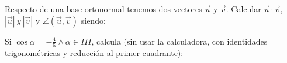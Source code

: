 \documentclass[addpoints,spanish, 12pt,a4paper]{exam}
\begin{document}
        \begin{questions}
        \question Respecto de una base ortonormal tenemos dos vectores $\overrightarrow{u}$ y $\overrightarrow{v}$.
Calcular $\overrightarrow{u}\cdot\overrightarrow{v}$, $|\overrightarrow{u}| \ y \ |\overrightarrow{v}|$ 
y $\angle(\overrightarrow{u},\overrightarrow{v})$ siendo:
        \begin{multicols}{1} 
        \end{multicols}
        \question Si $\cos\alpha=-\frac{4}{5}\land \alpha \in III$, calcula (sin usar la calculadora, con identidades trigonométricas y reducción al primer cuadrante):
        \begin{multicols}{1} 
\end{multicols}
\end{questions}
\end{document}
